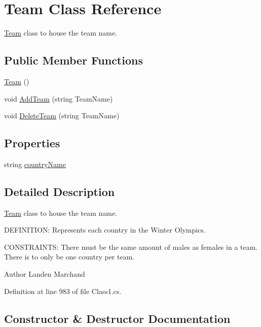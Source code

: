 \hypertarget{classTeam}{}\section{Team Class Reference}
\label{classTeam}


\hyperlink{classTeam}{Team} class to house the team name.  


\subsection*{Public Member Functions}
\begin{DoxyCompactItemize}
\item 
\hyperlink{classTeam_ad93bf55f26a13507f328d96ae6d25918}{Team} ()
\item 
void \hyperlink{classTeam_a057fd5f0d29ee5d92f47b312e0fc6dbf}{Add\+Team} (string Team\+Name)
\item 
void \hyperlink{classTeam_a6b2ab2e650439bf7b915b3423cf5787f}{Delete\+Team} (string Team\+Name)
\end{DoxyCompactItemize}
\subsection*{Properties}
\begin{DoxyCompactItemize}
\item 
string \hyperlink{classTeam_abe0a9396e60ebf155cf10c0700214753}{country\+Name}
\end{DoxyCompactItemize}


\subsection{Detailed Description}
\hyperlink{classTeam}{Team} class to house the team name. 

D\+E\+F\+I\+N\+I\+T\+I\+ON\+: Represents each country in the Winter Olympics.

C\+O\+N\+S\+T\+R\+A\+I\+N\+TS\+: There must be the same amount of males as females in a team. There is to only be one country per team.\begin{DoxyAuthor}{Author}
Landen Marchand 
\end{DoxyAuthor}


Definition at line 983 of file Class1.\+cs.



\subsection{Constructor \& Destructor Documentation}
\mbox{\label{classTeam_ad93bf55f26a13507f328d96ae6d25918}} 
